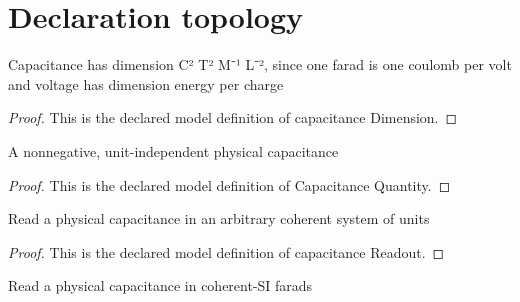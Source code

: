 \section{Declaration topology}
\begin{definition}
  \label{def:physics:phyx-mini-0878:phyxminiproblems-problemphyxmini0878-capacitancedimension}
  Capacitance has dimension C² T² M⁻¹ L⁻², since one farad is one coulomb per volt and voltage has dimension energy per charge
\end{definition}
\begin{proof}
  This is the declared model definition of capacitance Dimension.
\end{proof}
\begin{definition}
  \label{def:physics:phyx-mini-0878:phyxminiproblems-problemphyxmini0878-capacitancequantity}
  A nonnegative, unit-independent physical capacitance
\end{definition}
\begin{proof}
  This is the declared model definition of Capacitance Quantity.
\end{proof}
\begin{definition}
  \label{def:physics:phyx-mini-0878:phyxminiproblems-problemphyxmini0878-capacitancereadout}
  Read a physical capacitance in an arbitrary coherent system of units
\end{definition}
\begin{proof}
  This is the declared model definition of capacitance Readout.
\end{proof}
\begin{definition}
  \label{def:physics:phyx-mini-0878:phyxminiproblems-problemphyxmini0878-capacitanceinfarads}
  Read a physical capacitance in coherent-SI farads
\end{definition}
